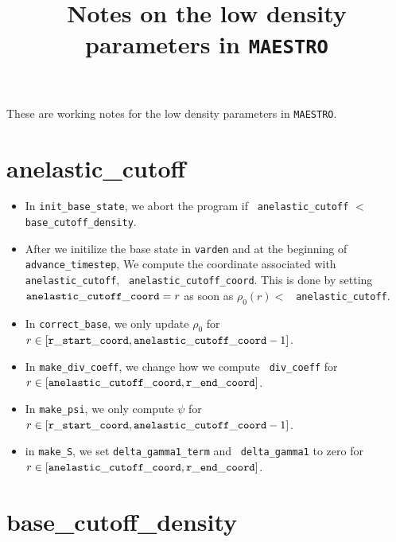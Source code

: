 \documentclass[11pt]{article}
\title{Notes on the low density parameters in {\tt MAESTRO}}
\begin{document}
\maketitle
\tableofcontents

These are working notes for the low density parameters in {\tt MAESTRO}.

\section{anelastic\_cutoff}

\begin{itemize}

\item In {\tt init\_base\_state}, we abort the program if {\tt
  anelastic\_cutoff} $<$ {\tt base\_cutoff\_density}.

\item After we initilize the base state in {\tt varden} and at the
  beginning of {\tt advance\_timestep}, We compute the coordinate
  associated with {\tt anelastic\_cutoff}, {\tt
    anelastic\_cutoff\_coord}.  This is done by setting ${\tt
    anelastic\_cutoff\_coord}= r$ as soon as $\rho_0(r) <$ {\tt
    anelastic\_cutoff}.

\item In {\tt correct\_base}, we only update $\rho_0$ for $r\in[{\tt
    r\_start\_coord},{\tt anelastic\_cutoff\_coord}-1]$.

\item In {\tt make\_div\_coeff}, we change how we compute {\tt
  div\_coeff} for $r\in[{\tt anelastic\_cutoff\_coord},{\tt
    r\_end\_coord}]$.

\item In {\tt make\_psi}, we only compute $\psi$ for $r\in[{\tt
    r\_start\_coord},{\tt anelastic\_cutoff\_coord}-1]$.

\item in {\tt make\_S}, we set {\tt delta\_gamma1\_term} and {\tt
  delta\_gamma1} to zero for $r\in[{\tt anelastic\_cutoff\_coord},{\tt
    r\_end\_coord}]$.
\end{itemize}

\section{base\_cutoff\_density}
\end{document}
